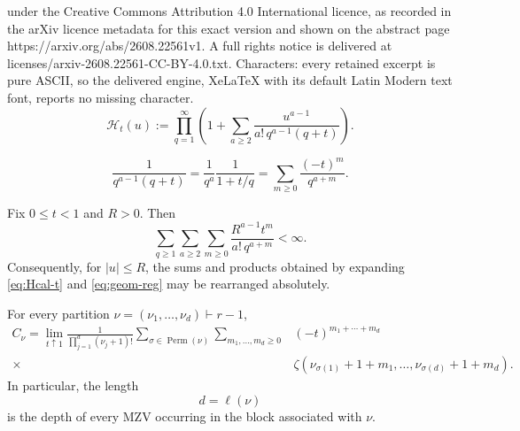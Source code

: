 \documentclass[10pt,a4paper]{amsart}
\begin{document}
under the Creative Commons Attribution 4.0 International licence, as recorded in the arXiv licence metadata for this exact version and shown on the abstract page https://arxiv.org/abs/2608.22561v1. A full rights notice is delivered at licenses/arxiv-2608.22561-CC-BY-4.0.txt. Characters: every retained excerpt is pure ASCII, so the delivered engine, XeLaTeX with its default Latin Modern text font, reports no missing character.
\begin{equation}\label{eq:Hcal-t}
 \mathcal H_t(u)
 :=
 \prod_{q=1}^\infty
 \left(
 1+
 \sum_{a\geq2}
 \frac{u^{a-1}}
 {a!\,q^{a-1}(q+t)}
 \right).
\end{equation}

\begin{equation}\label{eq:geom-reg}
 \frac{1}{q^{a-1}(q+t)}
 =
 \frac1{q^a}\frac1{1+t/q}
 =
 \sum_{m\geq0}
 \frac{(-t)^m}{q^{a+m}}.
\end{equation}

\begin{lemma}
\label{lem:regabs}
Fix $0\leq t<1$ and $R>0$.  Then
\begin{equation}\label{eq:regabs}
 \sum_{q\geq1}
 \sum_{a\geq2}
 \sum_{m\geq0}
 \frac{R^{a-1}t^m}
 {a!\,q^{a+m}}
 <\infty.
\end{equation}
Consequently, for $|u|\leq R$, the sums and products obtained by
expanding \eqref{eq:Hcal-t} and \eqref{eq:geom-reg} may be rearranged
absolutely.
\end{lemma}

\begin{theorem}
\label{thm:CnuMZV}
For every partition
$\nu=(\nu_1,\ldots,\nu_d)\vdash r-1$,
\begin{align}
 C_\nu
 =
 \lim_{t\uparrow1}
 \frac{1}
 {\prod_{j=1}^d(\nu_j+1)!}
 \sum_{\sigma\in\operatorname{Perm}(\nu)}
 \sum_{m_1,\ldots,m_d\geq0}
 &
 (-t)^{m_1+\cdots+m_d}
 \nonumber\\
 {}\times&
 \zeta\!\left(
 \nu_{\sigma(1)}+1+m_1,\ldots,
 \nu_{\sigma(d)}+1+m_d
 \right).
 \label{eq:CnuMZV}
\end{align}
In particular, the length
\[
        d=\ell(\nu)
\]
is the depth of every MZV occurring in the block associated with
$\nu$.
\end{theorem}
\end{document}
